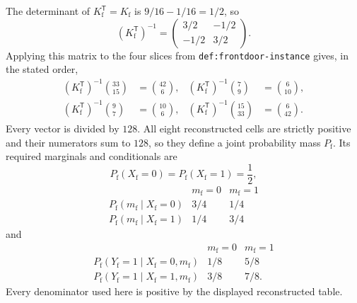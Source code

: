 The determinant of \(K_{\mathrm f}^{\mathsf T}=K_{\mathrm f}\) is \(9/16-1/16=1/2\), so
\[
 (K_{\mathrm f}^{\mathsf T})^{-1}
 =\begin{pmatrix}3/2&-1/2\\-1/2&3/2\end{pmatrix}.
\]
Applying this matrix to the four slices from \texttt{def:frontdoor-instance} gives, in the stated order,
\[
\begin{aligned}
 (K_{\mathrm f}^{\mathsf T})^{-1}\binom{33}{15}&=\binom{42}{6},&
 (K_{\mathrm f}^{\mathsf T})^{-1}\binom{7}{9}&=\binom{6}{10},\\
 (K_{\mathrm f}^{\mathsf T})^{-1}\binom{9}{7}&=\binom{10}{6},&
 (K_{\mathrm f}^{\mathsf T})^{-1}\binom{15}{33}&=\binom{6}{42}.
\end{aligned}
\]
Every vector is divided by \(128\).  All eight reconstructed cells are strictly positive and their numerators sum to \(128\), so they define a joint probability mass \(P_{\mathrm f}\).  Its required marginals and conditionals are
\[
 P_{\mathrm f}(X_{\mathrm f}=0)=P_{\mathrm f}(X_{\mathrm f}=1)=\frac12,
\]
\[
\begin{array}{c|cc}
 &m_{\mathrm f}=0&m_{\mathrm f}=1\\ \hline
 P_{\mathrm f}(m_{\mathrm f}\mid X_{\mathrm f}=0)&3/4&1/4\\
 P_{\mathrm f}(m_{\mathrm f}\mid X_{\mathrm f}=1)&1/4&3/4
\end{array}
\]
and
\[
\begin{array}{c|cc}
 &m_{\mathrm f}=0&m_{\mathrm f}=1\\ \hline
 P_{\mathrm f}(Y_{\mathrm f}=1\mid X_{\mathrm f}=0,m_{\mathrm f})&1/8&5/8\\
 P_{\mathrm f}(Y_{\mathrm f}=1\mid X_{\mathrm f}=1,m_{\mathrm f})&3/8&7/8.
\end{array}
\]
Every denominator used here is positive by the displayed reconstructed table.

